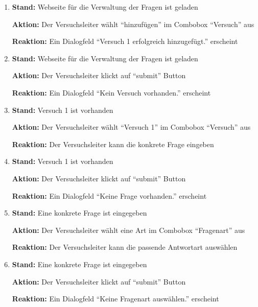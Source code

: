 \documentclass[a4paper]{scrreprt}
\begin{document}
\begin{itemize}
\begin{enumerate}
                        \item \par \textbf{Stand: } Webseite für die Verwaltung der Fragen ist geladen
                              \par \textbf{Aktion: } Der Versuchsleiter wählt ``hinzufügen'' im Combobox ``Versuch'' aus
                              \par \textbf{Reaktion: } Ein Dialogfeld ``Versuch 1 erfolgreich hinzugefügt.'' erscheint

                        \item \par \textbf{Stand: } Webseite für die Verwaltung der Fragen ist geladen
                              \par \textbf{Aktion: } Der Versuchsleiter klickt auf ``submit'' Button
                              \par \textbf{Reaktion: } Ein Dialogfeld ``Kein Versuch vorhanden.'' erscheint


                        \item \par \textbf{Stand: } Versuch 1 ist vorhanden
                              \par \textbf{Aktion: } Der Versuchsleiter wählt ``Versuch 1'' im Combobox ``Versuch'' aus
                              \par \textbf{Reaktion: } Der Versuchsleiter kann die konkrete Frage eingeben

                        \item \par \textbf{Stand: } Versuch 1 ist vorhanden
                              \par \textbf{Aktion: } Der Versuchsleiter klickt auf ``submit'' Button
                              \par \textbf{Reaktion: } Ein Dialogfeld ``Keine Frage vorhanden.'' erscheint

                        \item \par \textbf{Stand: } Eine konkrete Frage ist eingegeben
                              \par \textbf{Aktion: } Der Versuchsleiter wählt eine Art im Combobox ``Fragenart'' aus
                              \par \textbf{Reaktion: } Der Versuchsleiter kann die passende Antwortart auswählen

                        \item \par \textbf{Stand: } Eine konkrete Frage ist eingegeben
                              \par \textbf{Aktion: } Der Versuchsleiter klickt auf ``submit'' Button
                              \par \textbf{Reaktion: } Ein Dialogfeld ``Keine Fragenart auswählen.'' erscheint


\end{enumerate}
\end{itemize}
\end{document}

